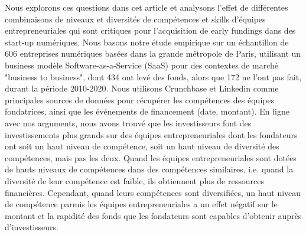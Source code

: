 \documentclass[12pt]{article}
\begin{document}
Nous explorons ces questions dans cet article et analysons l'effet de différentes combinaisons de niveaux et diversités de compétences et skills d'équipes entrepreneuriales qui sont critiques pour l'acquisition de early fundings dans des start-up numériques. Nous basons notre étude empirique sur un échantillon de 606 entreprises numériques basées dans la grande métropole de Paris, utilisant un business modèle Software-as-a-Service (SaaS) pour des contextes de marché "business to business", dont 434 ont levé des fonds, alors que 172 ne l'ont pas fait, durant la période 2010-2020. Nous utilisons Crunchbase et Linkedin comme principales sources de données pour récupérer les compétences des équipes fondatrices, ainsi que les événements de financement (date, montant). En ligne avec nos arguments, nous avons trouvé que les investisseurs font des investissements plus grands sur des équipes entrepreneuriales dont les fondateurs ont soit un haut niveau de compétence, soit un haut niveau de diversité des compétences, mais pas les deux. Quand les équipes entrepreneuriales sont dotées de hauts niveaux de compétences dans des compétences similaires, i.e. quand la diversité de leur compétence est faible, ils obtiennent plus de ressources financières. Cependant, quand leurs compétences sont diversifiées, un haut niveau de compétence parmis les équipes entrepreneuriales a un effet négatif sur le montant et la rapidité des fonds que les fondateurs sont capables d'obtenir auprès d'investisseurs.
\end{document}
